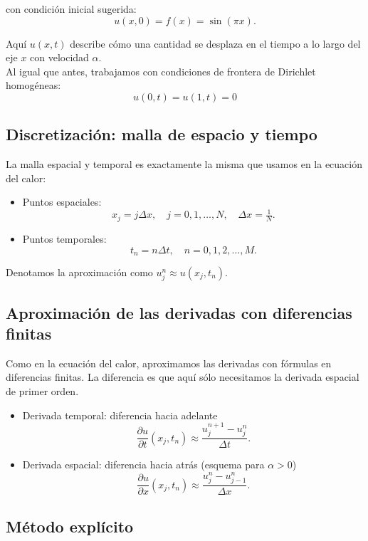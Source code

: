 \documentclass[12pt,a4paper]{article}
\begin{document}
con condición inicial sugerida:
\[
u(x,0) = f(x) = \sin(\pi x).
\]

Aquí $u(x,t)$ describe cómo una cantidad se desplaza en el tiempo a lo largo del eje $x$ con velocidad $\alpha$. \\

Al igual que antes, trabajamos con condiciones de frontera de Dirichlet homogéneas:
\[
u(0,t)=u(1,t)=0
\]

\subsection{Discretización: malla de espacio y tiempo}

La malla espacial y temporal es exactamente la misma que usamos en la ecuación del calor:

\begin{itemize}
    \item Puntos espaciales:
    \[
    x_j = j \Delta x, \quad j = 0,1,\dots,N, \quad \Delta x = \tfrac{1}{N}.
    \]

    \item Puntos temporales:
    \[
    t_n = n\Delta t, \quad n = 0,1,2,\dots,M.
    \]
\end{itemize}

Denotamos la aproximación como $u_j^n \approx u(x_j,t_n)$.

\subsection{Aproximación de las derivadas con diferencias finitas}

Como en la ecuación del calor, aproximamos las derivadas con fórmulas en diferencias finitas.  
La diferencia es que aquí sólo necesitamos la derivada espacial de primer orden.

\begin{itemize}
    \item Derivada temporal: diferencia hacia adelante
    \[
    \frac{\partial u}{\partial t}(x_j,t_n) \approx \frac{u_j^{n+1}-u_j^n}{\Delta t}.
    \]

    \item Derivada espacial: diferencia hacia atrás (esquema para $\alpha>0$)
    \[
    \frac{\partial u}{\partial x}(x_j,t_n) \approx \frac{u_j^n - u_{j-1}^n}{\Delta x}.
    \]
\end{itemize}

\subsection{Método explícito}
\end{document}
